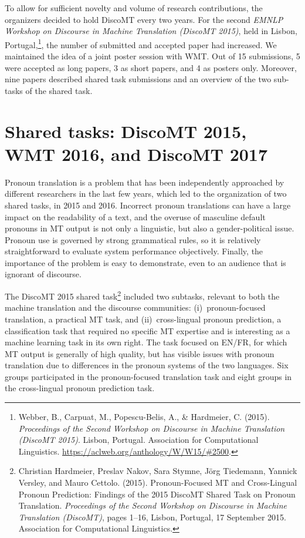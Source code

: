 \documentclass[11pt]{article}
\begin{document}
To allow for sufficient novelty and volume of research contributions, the
organizers decided to hold DiscoMT every two years.  For the second
\textit{EMNLP Workshop on Discourse in Machine Translation (DiscoMT 2015)},
held in Lisbon, Portugal,\footnote{Webber, B., Carpuat, M., Popescu-Belis, A., \& Hardmeier, C. (2015). \textit{Proceedings of the Second Workshop on Discourse in Machine Translation (DiscoMT 2015)}. Lisbon, Portugal. Association for Computational Linguistics.  \url{https://aclweb.org/anthology/W/W15/\#2500}.}, the number of submitted and accepted paper had increased.  We maintained the idea of a joint poster session with WMT.  Out of 15 submissions,
5 were accepted as long papers, 3 as short papers, and 4 as posters only.  Moreover, nine papers described shared task submissions and an overview of the two sub-tasks of the shared task.

\section{Shared tasks: DiscoMT 2015, WMT 2016, and DiscoMT 2017}

Pronoun translation is a problem that has been independently approached
by different researchers in the last few years, which led to the organization of two shared tasks, in 2015 and 2016.
Incorrect pronoun translations can have a large impact on the readability
of a text, and the overuse of masculine default pronouns in MT output is not
only a linguistic, but also a gender-political issue.
Pronoun use is governed by strong grammatical rules, so it is relatively
straightforward to evaluate system performance objectively. Finally, the
importance of the problem is easy to demonstrate, even to an audience that is
ignorant of discourse.

The DiscoMT 2015 shared task\footnote{Christian Hardmeier, Preslav Nakov, Sara Stymne, Jörg Tiedemann, Yannick Versley, and Mauro Cettolo. (2015). Pronoun-Focused MT and Cross-Lingual Pronoun Prediction: Findings of the 2015 DiscoMT Shared Task on Pronoun Translation.  \textit{Proceedings of the Second Workshop on Discourse in Machine Translation (DiscoMT)}, pages 1–16, Lisbon, Portugal, 17 September 2015.  Association for Computational Linguistics.}
included two subtasks, relevant to both the machine translation and the discourse communities: (i)~pronoun-focused translation, a practical
MT task, and (ii)~cross-lingual pronoun prediction, a classification task that required no specific MT expertise and is interesting as a machine learning task in its own right. The task focused on EN/FR, for which MT output is generally of high quality, but has visible issues with pronoun translation due
to differences in the pronoun systems of the two languages. Six groups participated in the pronoun-focused translation task and eight groups in the cross-lingual pronoun prediction task.
\end{document}
